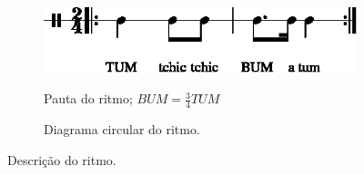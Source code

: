 \begin{figure}[H]
\centering
     \begin{subfigure}[c]{0.45\textwidth}
         \centering
         \href{https://drive.google.com/file/d/19gZ2jUqMUFKtJbGxlWl-97hUib1vwEHr/view?usp=sharing}{\includegraphics[width=\textwidth]{chapters/cap-musicalidade-percepcion/treino-ritmo5-1.eps}}
         \caption{Pauta do ritmo; $BUM=\frac{3}{4}TUM$}
         \label{fig:Ritmocomplexo1:1}
     \end{subfigure}
     \hfill
     \begin{subfigure}[c]{0.45\textwidth}
         \centering
{}
         \caption{Diagrama circular do ritmo.}
         \label{fig:Ritmocomplexo1:2}
     \end{subfigure}
\caption{Descrição do ritmo.}
\label{fig:abc-percepcionritmica5}
\end{figure}





